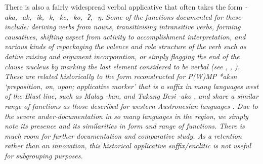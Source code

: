 There is also a fairly widespread verbal applicative that often
takes the form \it{-aka,
-ak, -ik, -k, -ke, -ko, -ʔ, -ŋ}.
Some of the functions documented for these include: deriving
verbs from nouns, transitivising intransitive verbs, forming causatives,
shifting aspect from activity to accomplishment interpretation,
and various kinds of repackaging the valence
and role structure of the verb such as dative raising
and argument incorporation, or simply flagging the end of the
clause nucleus by marking the last element considered to be verbal
(see \citealp{Jonker1906,Grimes1991b}, \citealp[108-112]{Grimes1991c}, \citealp{Tamelan2021}).
These are related historically to the form reconstructed for
P(W)MP *akən ‘preposition, on, upon; applicative marker’ that is a suffix in many languages
west of the Blust line,
such as Malay \it{-kan},
and Tukang Besi \it{-ako} \citep{Donohue1999a},
and share a similar range of functions as those described for
western Austronesian languages \citep{TruongMcDonnell2021}.
Due to the severe under-documentation in so many languages in
the region, we simply note its presence
and its similarities in form
and range of functions.
There is much room for further documentation and comparative study.
As a retention rather than an innovation,
this historical applicative suffix/enclitic is not useful for subgrouping purposes.

